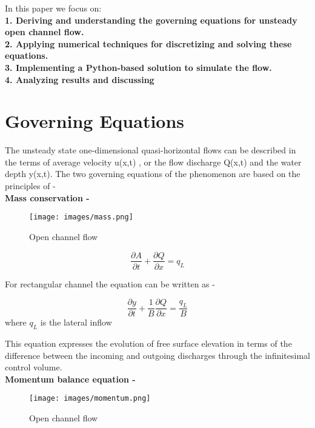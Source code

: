\documentclass{article}
\begin{document}
\noindent
In this paper we focus on:\\

\noindent
\textbf{1. Deriving and understanding the governing equations for unsteady open channel flow.}\\

\noindent
\textbf{2. Applying numerical techniques for discretizing and solving these equations.}\\

\noindent
\textbf{3. Implementing a Python-based solution to simulate the flow.}\\

\noindent
\textbf{4. Analyzing results and discussing}\\

\section{Governing Equations}
The unsteady state one-dimensional quasi-horizontal flows can be described in the terms of average 
velocity u(x,t) , or the flow discharge Q(x,t) and the water depth y(x,t). The two governing equations of the 
phenomenon are based on the principles of -\\


\noindent
\textbf{Mass conservation -}

\begin{figure}[H]
    \centering
    \texttt{[image: images/mass.png]}
    \caption{Open channel flow}
    \label{fig:sample}
\end{figure}


\[ \frac{\partial A }{\partial t} + \frac{\partial Q}{\partial x} = q_L\]

For rectangular channel the equation can be written as - 

\[ \frac{\partial y}{\partial t} + \frac{1}{B} \frac{\partial Q}{\partial x} =  \frac{q_L}{B} \]
where \(q_L\) is the lateral inflow 

This equation expresses the evolution of free surface elevation in terms of the difference between the incoming 
and outgoing discharges through the infinitesimal control volume.\\

\noindent
\textbf{Momentum balance equation - }\\

\begin{figure}[H]
    \centering
    \texttt{[image: images/momentum.png]}
    \caption{Open channel flow}
    \label{fig:sample}
\end{figure}
\end{document}
